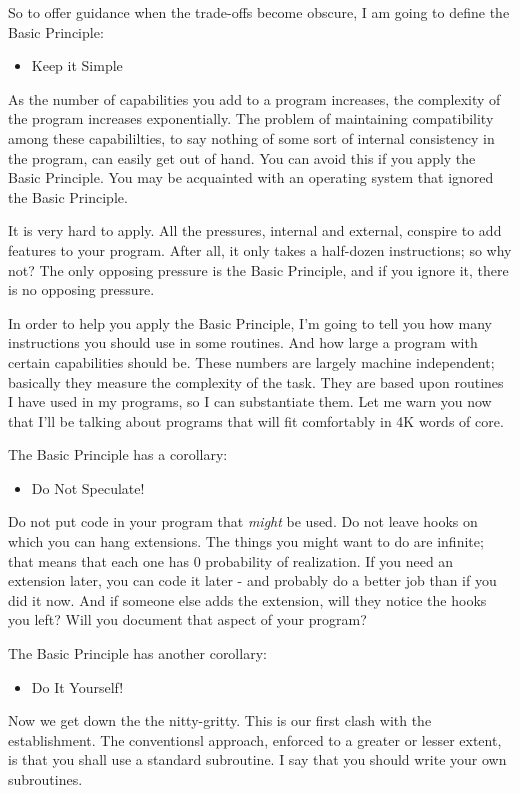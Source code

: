 \documentclass[b5paper, oneside]{book}
\begin{document}
So to offer guidance when the trade-offs become obscure, I am going to define the Basic Principle:\begin{itemize}
   \item Keep it Simple\end{itemize}

As the number of capabilities you add to a program increases, the complexity of the program increases exponentially. The problem of maintaining compatibility among these capabililties, to say nothing of some sort of internal consistency in the program, can easily get out of hand. You can avoid this if you apply the Basic Principle. You may be acquainted with an operating system that ignored the Basic Principle.

It is very hard to apply. All the pressures, internal and external, conspire to add features to your program. After all, it only takes a half-dozen instructions; so why not? The only opposing pressure is the Basic Principle, and if you ignore it, there is no opposing pressure.

In order to help you apply the Basic Principle, I'm going to tell you how many instructions you should use in some routines. And how large a program with certain capabilities should be. These numbers are largely machine independent; basically they measure the complexity of the task. They are based upon routines I have used in my programs, so I can substantiate them. Let me warn you now that I'll be talking about programs that will fit comfortably in 4K words of core.

The Basic Principle has a corollary:\begin{itemize}
   \item Do Not Speculate!\end{itemize}
Do not put code in your program that {\em might} be used. Do not leave hooks on which you can hang extensions. The things you might want to do are infinite; that means that each one has 0 probability of realization. If you need an extension later, you can code it later - and probably do a better job than if you did it now. And if someone else adds the extension, will they notice the hooks you left? Will you document that aspect of your program?

The Basic Principle has another corollary:\begin{itemize}
   \item Do It Yourself!\end{itemize}
Now we get down the the nitty-gritty. This is our first clash with the establishment. The conventionsl approach, enforced to a greater or lesser extent, is that you shall use a standard subroutine. I say that you should write your own subroutines.
\end{document}
